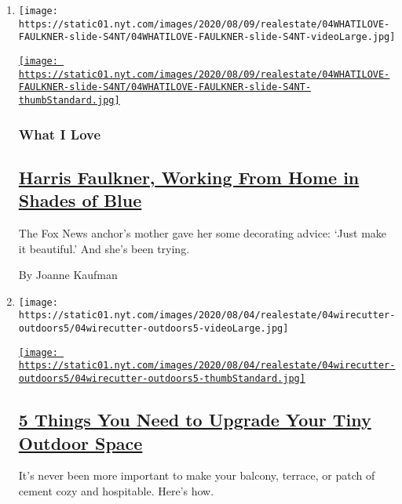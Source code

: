 \begin{enumerate}
\def\labelenumi{\arabic{enumi}.}
\item
  \texttt{[image: https://static01.nyt.com/images/2020/08/09/realestate/04WHATILOVE-FAULKNER-slide-S4NT/04WHATILOVE-FAULKNER-slide-S4NT-videoLarge.jpg]}

  \href{/2020/08/04/realestate/harris-faulkner-home-fox-news.html}{\texttt{[image: https://static01.nyt.com/images/2020/08/09/realestate/04WHATILOVE-FAULKNER-slide-S4NT/04WHATILOVE-FAULKNER-slide-S4NT-thumbStandard.jpg]}}

  \hypertarget{what-i-love}{%
  \subsubsection{What I Love}\label{what-i-love}}

  \hypertarget{harris-faulkner-working-from-home-in-shades-of-blue}{%
  \subsection{\texorpdfstring{\href{/2020/08/04/realestate/harris-faulkner-home-fox-news.html}{Harris
  Faulkner, Working From Home in Shades of
  Blue}}{Harris Faulkner, Working From Home in Shades of Blue}}\label{harris-faulkner-working-from-home-in-shades-of-blue}}

  The Fox News anchor's mother gave her some decorating advice: `Just
  make it beautiful.' And she's been trying.

  By Joanne Kaufman
\item
  \texttt{[image: https://static01.nyt.com/images/2020/08/04/realestate/04wirecutter-outdoors5/04wirecutter-outdoors5-videoLarge.jpg]}

  \href{/2020/08/04/realestate/upgrade-your-outdoor-space.html}{\texttt{[image: https://static01.nyt.com/images/2020/08/04/realestate/04wirecutter-outdoors5/04wirecutter-outdoors5-thumbStandard.jpg]}}

  \hypertarget{5-things-you-need-to-upgrade-your-tiny-outdoor-space}{%
  \subsection{\texorpdfstring{\href{/2020/08/04/realestate/upgrade-your-outdoor-space.html}{5
  Things You Need to Upgrade Your Tiny Outdoor
  Space}}{5 Things You Need to Upgrade Your Tiny Outdoor Space}}\label{5-things-you-need-to-upgrade-your-tiny-outdoor-space}}

  It's never been more important to make your balcony, terrace, or patch
  of cement cozy and hospitable. Here's how.


\end{enumerate}
